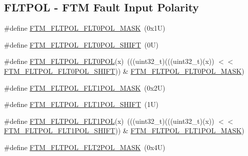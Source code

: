 \subsection*{F\+L\+T\+P\+OL -\/ F\+TM Fault Input Polarity}
\begin{DoxyCompactItemize}
\item 
\#define \mbox{\hyperlink{group___f_t_m___register___masks_gac9a93adce89d23693d4895ea49c95fb0}{F\+T\+M\+\_\+\+F\+L\+T\+P\+O\+L\+\_\+\+F\+L\+T0\+P\+O\+L\+\_\+\+M\+A\+SK}}~(0x1\+U)
\item 
\#define \mbox{\hyperlink{group___f_t_m___register___masks_gaced2a4f6b0cfb4d3f76b81ed36f56188}{F\+T\+M\+\_\+\+F\+L\+T\+P\+O\+L\+\_\+\+F\+L\+T0\+P\+O\+L\+\_\+\+S\+H\+I\+FT}}~(0\+U)
\item 
\#define \mbox{\hyperlink{group___f_t_m___register___masks_gadaacd100d78453d1cd175156838852b2}{F\+T\+M\+\_\+\+F\+L\+T\+P\+O\+L\+\_\+\+F\+L\+T0\+P\+OL}}(x)~(((uint32\+\_\+t)(((uint32\+\_\+t)(x)) $<$$<$ \mbox{\hyperlink{group___f_t_m___register___masks_gaced2a4f6b0cfb4d3f76b81ed36f56188}{F\+T\+M\+\_\+\+F\+L\+T\+P\+O\+L\+\_\+\+F\+L\+T0\+P\+O\+L\+\_\+\+S\+H\+I\+FT}})) \& \mbox{\hyperlink{group___f_t_m___register___masks_gac9a93adce89d23693d4895ea49c95fb0}{F\+T\+M\+\_\+\+F\+L\+T\+P\+O\+L\+\_\+\+F\+L\+T0\+P\+O\+L\+\_\+\+M\+A\+SK}})
\item 
\#define \mbox{\hyperlink{group___f_t_m___register___masks_gaa7b2fdfe55a6efb22cd8df8b071cac7c}{F\+T\+M\+\_\+\+F\+L\+T\+P\+O\+L\+\_\+\+F\+L\+T1\+P\+O\+L\+\_\+\+M\+A\+SK}}~(0x2\+U)
\item 
\#define \mbox{\hyperlink{group___f_t_m___register___masks_ga9b9e4e91e33926535a3b8f981f3058d6}{F\+T\+M\+\_\+\+F\+L\+T\+P\+O\+L\+\_\+\+F\+L\+T1\+P\+O\+L\+\_\+\+S\+H\+I\+FT}}~(1\+U)
\item 
\#define \mbox{\hyperlink{group___f_t_m___register___masks_gade53bcaf8eca6b77bc235d1d290f3801}{F\+T\+M\+\_\+\+F\+L\+T\+P\+O\+L\+\_\+\+F\+L\+T1\+P\+OL}}(x)~(((uint32\+\_\+t)(((uint32\+\_\+t)(x)) $<$$<$ \mbox{\hyperlink{group___f_t_m___register___masks_ga9b9e4e91e33926535a3b8f981f3058d6}{F\+T\+M\+\_\+\+F\+L\+T\+P\+O\+L\+\_\+\+F\+L\+T1\+P\+O\+L\+\_\+\+S\+H\+I\+FT}})) \& \mbox{\hyperlink{group___f_t_m___register___masks_gaa7b2fdfe55a6efb22cd8df8b071cac7c}{F\+T\+M\+\_\+\+F\+L\+T\+P\+O\+L\+\_\+\+F\+L\+T1\+P\+O\+L\+\_\+\+M\+A\+SK}})
\item 
\#define \mbox{\hyperlink{group___f_t_m___register___masks_ga0810edda6aa6e4a53808b33db2049072}{F\+T\+M\+\_\+\+F\+L\+T\+P\+O\+L\+\_\+\+F\+L\+T2\+P\+O\+L\+\_\+\+M\+A\+SK}}~(0x4\+U)
\item 

\end{DoxyCompactItemize}
